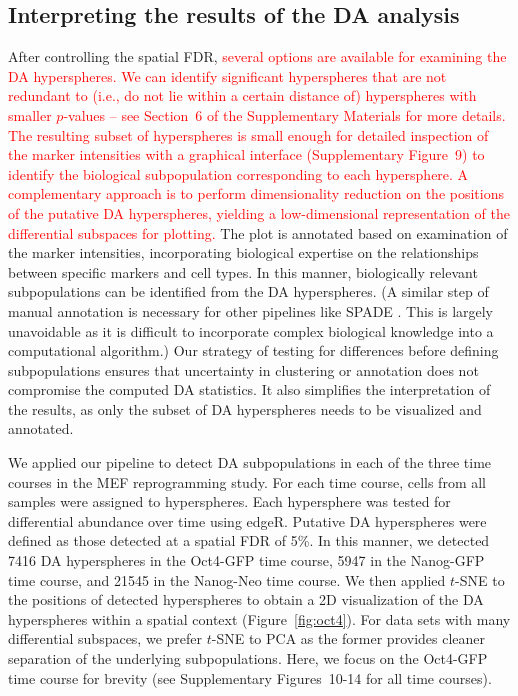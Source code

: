 \documentclass{article}
\newcommand\revised[1]{\textcolor{red}{#1}}
\newcommand{\suppinterpret}{6}
\newcommand{\suppfiginterpret}{9}
\newcommand{\suppfigrealextra}{10-14}
\begin{document}
\subsection{Interpreting the results of the DA analysis}
After controlling the spatial FDR, \revised{several options are available for examining the DA hyperspheres.
We can identify significant hyperspheres that are not redundant to (i.e., do not lie within a certain distance of) hyperspheres with smaller $p$-values -- see Section~\suppinterpret{} of the Supplementary Materials for more details.
The resulting subset of hyperspheres is small enough for detailed inspection of the marker intensities with a graphical interface (Supplementary Figure~\suppfiginterpret{}) to identify the biological subpopulation corresponding to each hypersphere.
A complementary approach is to perform dimensionality reduction on the positions of the putative DA hyperspheres, yielding a low-dimensional representation of the differential subspaces for plotting.}
The plot is annotated based on examination of the marker intensities, incorporating biological expertise on the relationships between specific markers and cell types.
In this manner, biologically relevant subpopulations can be identified from the DA hyperspheres.
(A similar step of manual annotation is necessary for other pipelines like SPADE \cite{anchang2016visualization}.
This is largely unavoidable as it is difficult to incorporate complex biological knowledge into a computational algorithm.)
Our strategy of testing for differences before defining subpopulations ensures that uncertainty in clustering or annotation does not compromise the computed DA statistics.
It also simplifies the interpretation of the results, as only the subset of DA hyperspheres needs to be visualized and annotated.

We applied our pipeline to detect DA subpopulations in each of the three time courses in the MEF reprogramming study.
For each time course, cells from all samples were assigned to hyperspheres.
Each hypersphere was tested for differential abundance over time using edgeR.
Putative DA hyperspheres were defined as those detected at a spatial FDR of 5\%.
In this manner, we detected 7416 DA hyperspheres in the Oct4-GFP time course, 5947 in the Nanog-GFP time course, and 21545 in the Nanog-Neo time course.
We then applied $t$-SNE \cite{van2008visualizing} to the positions of detected hyperspheres to obtain a 2D visualization of the DA hyperspheres within a spatial context (Figure~\ref{fig:oct4}).
For data sets with many differential subspaces, we prefer $t$-SNE to PCA as the former provides cleaner separation of the underlying subpopulations.
Here, we focus on the Oct4-GFP time course for brevity (see Supplementary Figures~\suppfigrealextra{} for all time courses).
\end{document}
